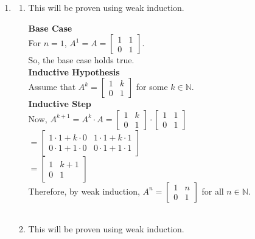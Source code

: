\documentclass[a4paper]{article}
\begin{document}
\begin{enumerate}
    \newpage
    \item \begin{enumerate}
        \item This will be proven using weak induction.
        
        \textbf{Base Case}\\
        For \(n = 1\), \(A^1 = A = \begin{bmatrix} 1 & 1 \\ 0 & 1 \end{bmatrix}\).\\
        So, the base case holds true.\\

        \textbf{Inductive Hypothesis}\\
        Assume that \(A^k = \begin{bmatrix} 1 & k \\ 0 & 1 \end{bmatrix}\) for some \(k \in \mathbb{N}\).\\

        \textbf{Inductive Step}\\
        Now, \(A^{k+1} = A^k \cdot A = \begin{bmatrix} 1 & k \\ 0 & 1 \end{bmatrix} \cdot \begin{bmatrix} 1 & 1 \\ 0 & 1 \end{bmatrix}\)\\
        \(= \begin{bmatrix} 1 \cdot 1 + k \cdot 0 & 1 \cdot 1 + k \cdot 1 \\ 0 \cdot 1 + 1 \cdot 0 & 0 \cdot 1 + 1 \cdot 1 \end{bmatrix}\)\\
        \(= \begin{bmatrix} 1 & k+1 \\ 0 & 1 \end{bmatrix}\)\\

        Therefore, by weak induction, \(A^n = \begin{bmatrix} 1 & n \\ 0 & 1 \end{bmatrix}\) for all \(n \in \mathbb{N}\).\\ \\


        \item This will be proven using weak induction.


\end{enumerate}
\end{enumerate}
\end{document}
